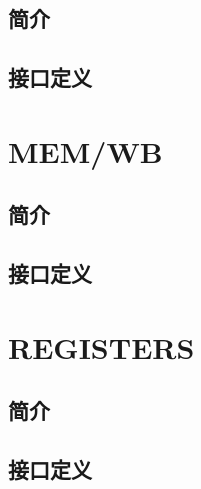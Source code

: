 \documentclass{article}
\begin{document}
\subsection{简介}

\subsection{接口定义}

\section{MEM/WB}
\label{sec:MEM/WB}

\subsection{简介}

\subsection{接口定义}

\section{REGISTERS}
\label{sec:REGISTERS}

\subsection{简介}

\FloatBarrier
\subsection{接口定义}
\end{document}
